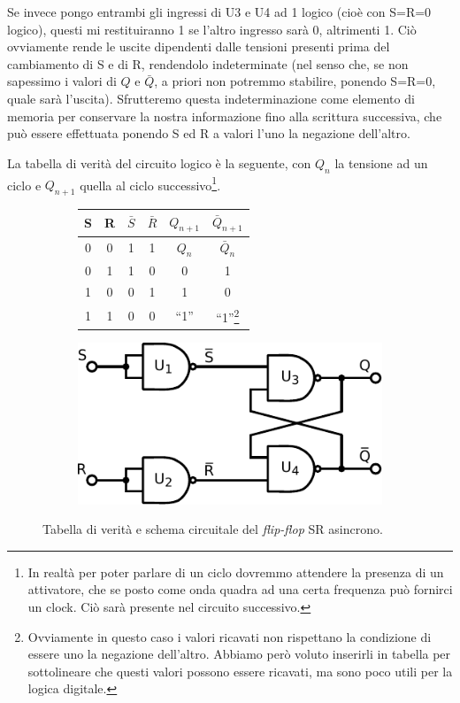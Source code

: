 Se invece pongo entrambi gli ingressi di U3 e U4 ad 1 logico (cioè con S=R=0 logico), questi mi restituiranno 1 se l'altro ingresso sarà 0, altrimenti 1.
Ciò ovviamente rende le uscite dipendenti dalle tensioni presenti prima del cambiamento di S e di R, rendendolo indeterminate (nel senso che, se non sapessimo i valori di $Q$ e $\bar Q$, a priori non potremmo stabilire, ponendo S=R=0, quale sarà l'uscita).
Sfrutteremo questa indeterminazione come elemento di memoria per conservare la nostra informazione fino alla scrittura successiva, che può essere effettuata ponendo S ed R a valori l'uno la negazione dell'altro.

La tabella di verità del circuito logico è la seguente, con $Q_n$ la tensione ad un ciclo e $Q_{n+1}$ quella al ciclo successivo\footnote{In realtà per poter parlare di un ciclo dovremmo attendere la presenza di un attivatore, che se posto come onda quadra ad una certa frequenza può fornirci un clock.
Ciò sarà presente nel circuito successivo.}.

\begin{savenotes}
\begin{figure}[htpc]
\centering
	\begin{subfigure}[hc]{.4\textwidth}
		\centering
		{\renewcommand{\arraystretch}{1.1}%
		\begin{tabular}{|c|c|c|c|c|c|}
		\hline
		S & R & $\bar S$ & $\bar R$ & $Q_{n+1}$ & $\bar Q_{n+1}$ \\
		\hline \hline
		0 & 0 & 1 & 1 & $Q_n$ & $\bar Q_n$\\
		\hline
		0 & 1 & 1 & 0 &  0  &  1\\
		\hline
		1 & 0 & 0 & 1 &  1  &  0\\
		\hline
		1 & 1 & 0 & 0 & ``1'' & ``1''\footnote{Ovviamente in questo caso i valori ricavati non rispettano la condizione di essere uno la negazione dell'altro.
Abbiamo però voluto inserirli in tabella per sottolineare che questi valori possono essere ricavati, ma sono poco utili per la logica digitale.}\\
		\hline
		\end{tabular}}
		\label{tab11:FFSR}
        \end{subfigure}
        \begin{subfigure}[hc]{.4\textwidth}
		\centering
		\includegraphics[width=.7\textwidth]{../E11/latex/FF-SR-async.pdf}
		\caption{}
		\label{cir11:FF-SR-a}
        \end{subfigure}
\caption{Tabella di verità e schema circuitale del \textit{flip-flop} SR asincrono.}
\end{figure}
\end{savenotes}

